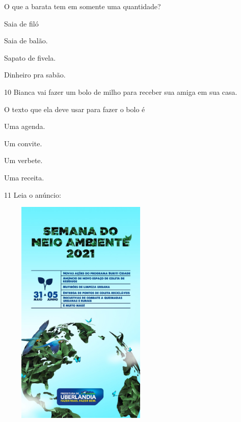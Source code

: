 
O que a barata tem em somente uma quantidade?

\begin{escolha}
\item Saia de filó

\item Saia de balão.

\item Sapato de fivela.

\item Dinheiro pra sabão.
\end{escolha}

\num{10} Bianca vai fazer um bolo de milho para receber sua amiga em sua casa.

O texto que ela deve usar para fazer o bolo é

\begin{escolha}
\item Uma agenda.

\item Um convite.

\item Um verbete.

\item Uma receita.
\end{escolha}

\num{11} Leia o anúncio:

\includegraphics[width=3.12674in,height=4.31210in]{media/image145.jpeg}

